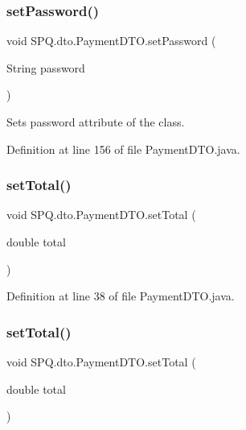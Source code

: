 \subsubsection{\texorpdfstring{set\+Password()}{setPassword()}\hspace{0.1cm}{\footnotesize\ttfamily [3/3]}}
{\footnotesize\ttfamily void S\+P\+Q.\+dto.\+Payment\+D\+T\+O.\+set\+Password (\begin{DoxyParamCaption}\item[{String}]{password }\end{DoxyParamCaption})}

Sets password attribute of the class. 

Definition at line 156 of file Payment\+D\+T\+O.\+java.

\mbox{\label{class_s_p_q_1_1dto_1_1_payment_d_t_o_a07f242511a5b2cd45fdf771203729c1b}} 
\subsubsection{\texorpdfstring{set\+Total()}{setTotal()}\hspace{0.1cm}{\footnotesize\ttfamily [1/3]}}
{\footnotesize\ttfamily void S\+P\+Q.\+dto.\+Payment\+D\+T\+O.\+set\+Total (\begin{DoxyParamCaption}\item[{double}]{total }\end{DoxyParamCaption})}



Definition at line 38 of file Payment\+D\+T\+O.\+java.

\mbox{\label{class_s_p_q_1_1dto_1_1_payment_d_t_o_a07f242511a5b2cd45fdf771203729c1b}} 
\subsubsection{\texorpdfstring{set\+Total()}{setTotal()}\hspace{0.1cm}{\footnotesize\ttfamily [2/3]}}
{\footnotesize\ttfamily void S\+P\+Q.\+dto.\+Payment\+D\+T\+O.\+set\+Total (\begin{DoxyParamCaption}\item[{double}]{total }\end{DoxyParamCaption})}



